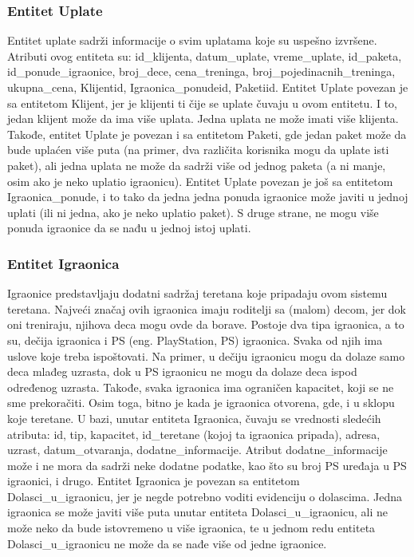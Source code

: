 \documentclass[../main.tex]{subfiles}
\begin{document}
\subsubsection{Entitet Uplate}

Entitet uplate sadrži informacije o svim uplatama koje su uspešno izvršene. Atributi ovog entiteta su: id\_klijenta, datum\_uplate, vreme\_uplate, id\_paketa, id\_ponude\_igraonice, broj\_dece, cena\_treninga, broj\_pojedinacnih\_treninga, ukupna\_cena, Klijentid, Igraonica\_ponudeid, Paketiid.
Entitet Uplate povezan je sa entitetom Klijent, jer je klijenti ti čije se uplate čuvaju u ovom entitetu. I to, jedan klijent može da ima više uplata. Jedna uplata ne može imati više klijenta. Takođe, entitet Uplate je povezan i sa entitetom Paketi, gde jedan paket može da bude uplaćen više puta (na primer, dva različita korisnika mogu da uplate isti paket), ali jedna uplata ne može da sadrži više od jednog paketa (a ni manje, osim ako je neko uplatio igraonicu). Entitet Uplate povezan je još sa entitetom Igraonica\_ponude, i to tako da jedna jedna ponuda igraonice može javiti u jednoj uplati (ili ni jedna, ako je neko uplatio paket). S druge strane, ne mogu više ponuda igraonice da se nađu u jednoj istoj uplati.


\subsubsection{Entitet Igraonica}
Igraonice predstavljaju dodatni sadržaj teretana koje pripadaju ovom sistemu teretana. Najveći značaj ovih igraonica imaju roditelji sa (malom) decom, jer dok oni treniraju, njihova deca mogu ovde da borave. Postoje dva tipa igraonica, a to su, dečija igraonica i PS (eng. PlayStation, PS) igraonica. Svaka od njih ima uslove koje treba ispoštovati. Na primer, u dečiju igraonicu mogu da dolaze samo deca mlađeg uzrasta, dok u PS igraonicu ne mogu da dolaze deca ispod određenog uzrasta. Takođe, svaka igraonica ima ograničen kapacitet, koji se ne sme prekoračiti. Osim toga, bitno je kada je igraonica otvorena, gde, i u sklopu koje teretane.
U bazi, unutar entiteta Igraonica, čuvaju se vrednosti sledećih atributa: id, tip, kapacitet, id\_teretane (kojoj ta igraonica pripada), adresa, uzrast, datum\_otvaranja, dodatne\_informacije. Atribut dodatne\_informacije može i ne mora da sadrži neke dodatne podatke, kao što su broj PS uređaja u PS igraonici, i drugo. Entitet Igraonica je povezan sa entitetom Dolasci\_u\_igraonicu, jer je negde potrebno voditi evidenciju o dolascima. Jedna igraonica se može javiti više puta unutar entiteta Dolasci\_u\_igraonicu, ali ne može neko da bude istovremeno u više igraonica, te u jednom redu entiteta Dolasci\_u\_igraonicu ne može da se nađe više od jedne igraonice.
\end{document}

